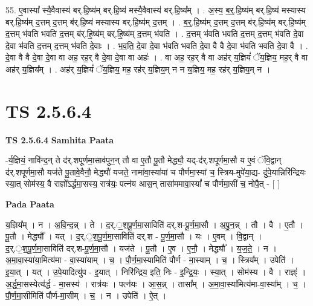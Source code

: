 \documentclass[17pt]{extarticle}
\begin{document}
55. ए॒वास्या᳚ स्यै॒वैवास्य॑ बर्.हि॒ष्य॑म् बर्.हि॒ष्य॑ मस्यै॒वैवास्य॑ बर्.हि॒ष्य᳚म् । . अ॒स्य॒ ब॒र्॒.हि॒ष्य॑म् बर्.हि॒ष्य॑ मस्यास्य बर्.हि॒ष्य॑म् द॒त्तम् द॒त्तम् ब॑र्.हि॒ष्य॑ मस्यास्य बर्.हि॒ष्य॑म् द॒त्तम् । . ब॒र्॒.हि॒ष्य॑म् द॒त्तम् द॒त्तम् ब॑र्.हि॒ष्य॑म् बर्.हि॒ष्य॑म् द॒त्तम् भ॑वति भवति द॒त्तम् ब॑र्.हि॒ष्य॑म् बर्.हि॒ष्य॑म् द॒त्तम् भ॑वति । . द॒त्तम् भ॑वति भवति द॒त्तम् द॒त्तम् भ॑वति दे॒वा दे॒वा भ॑वति द॒त्तम् द॒त्तम् भ॑वति दे॒वाः । . भ॒व॒ति॒ दे॒वा दे॒वा भ॑वति भवति दे॒वा वै वै दे॒वा भ॑वति भवति दे॒वा वै । . दे॒वा वै वै दे॒वा दे॒वा वा अह॒ रह॒र् वै दे॒वा दे॒वा वा अहः॑ । . वा अह॒ रह॒र् वै वा अह॑र् य॒ज्ञियं॑ ॅय॒ज्ञिय॒ मह॒र् वै वा अह॑र् य॒ज्ञिय᳚म् । . अह॑र् य॒ज्ञियं॑ ॅय॒ज्ञिय॒ मह॒ रह॑र् य॒ज्ञिय॒म् न न य॒ज्ञिय॒ मह॒ रह॑र् य॒ज्ञिय॒म् न । \newline
\pagebreak
{}

\section{ TS 2.5.6.4 }

\textbf{TS 2.5.6.4 } \newline
\textbf{Samhita Paata} \newline

-र्य॒ज्ञियं॒ नावि॑न्द॒न् ते द॑र्.शपूर्णमा॒साव॑पुन॒न् तौ वा ए॒तौ पू॒तौ मेद्ध्यौ॒ यद्-द॑र्.शपूर्णमा॒सौ य ए॒वं ॅवि॒द्वान् द॑र्.शपूर्णमा॒सौ यज॑ते पू॒तावे॒वैनौ॒ मेद्ध्यौ॑ यजते॒ नामा॑वा॒स्या॑यां च पौर्णमा॒स्यां च॒ स्त्रिय-मुपे॑या॒द्य- दु॑पे॒यान्निरि॑न्द्रियः स्या॒त् सोम॑स्य॒ वै राज्ञो᳚ऽर्द्धमा॒सस्य॒ रात्र॑यः॒ पत्न॑य आस॒न् तासा॑ममावा॒स्यां᳚ च पौर्णमा॒सीं च॒ नोपै॒त् - [  ] \newline

\textbf{Pada Paata} \newline

य॒ज्ञिय᳚म् । न । अ॒वि॒न्द॒न्न् । ते । द॒र्.॒श॒पू॒र्ण॒मा॒साविति॑ दर्.श-पू॒र्ण॒मा॒सौ । अ॒पु॒न॒न्न् । तौ । वै । ए॒तौ । पू॒तौ । मेद्ध्यौ᳚ । यत् । द॒र्.॒श॒पू॒र्ण॒मा॒साविति॑ दर्.श - पू॒र्ण॒मा॒सौ । यः । ए॒वम् । वि॒द्वान् । द॒र्.॒श॒पू॒र्ण॒मा॒साविति॑ दर्.श-पू॒र्ण॒मा॒सौ । यज॑ते । पू॒तौ । ए॒व । ए॒नौ॒ । मेद्ध्यौ᳚ । य॒ज॒ते॒ । न । अ॒मा॒वा॒स्या॑या॒मित्य॑मा - वा॒स्या॑याम् । च॒ । पौ॒र्ण॒मा॒स्यामिति॑ पौर्ण - मा॒स्याम् । च॒ । स्त्रिय᳚म् । उपेति॑ । इ॒या॒त् । यत् । उ॒पे॒यादित्यु॑प - इ॒यात् । निरि॑न्द्रिय॒ इति॒ निः - इ॒न्द्रि॒यः॒ । स्या॒त् । सोम॑स्य । वै । राज्ञ्ः॑ । अ॒र्द्ध॒मा॒सस्येत्य॑र्द्ध - मा॒सस्य॑ । रात्र॑यः । पत्न॑यः । आ॒स॒न्न् । तासा᳚म् । अ॒मा॒वा॒स्या॑मित्य॑मा-वा॒स्या᳚म् । च॒ । पौ॒र्ण॒मा॒सीमिति॑ पौर्ण-मा॒सीम् । च॒ । न । उपेति॑ । ऐ॒त् ।  \newline
\end{document}
